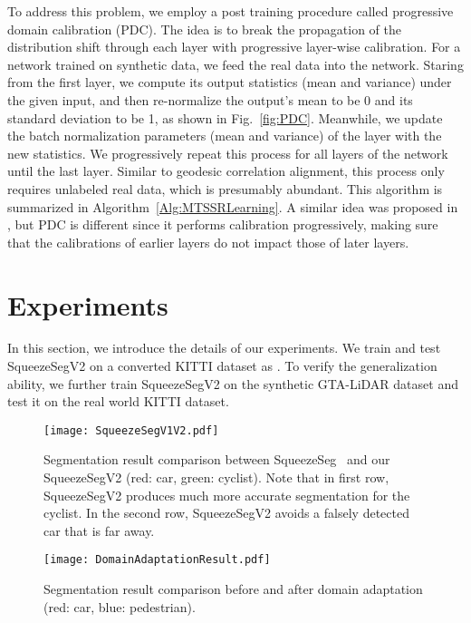 \documentclass[letterpaper, 10 pt, conference]{ieeeconf}
\begin{document}
To address this problem, we employ a post training procedure called progressive domain calibration (PDC). The idea is to break the propagation of the distribution shift through each layer with progressive layer-wise calibration. For a network trained on synthetic data, we feed the real data into the network. Staring from the first layer, we compute its output statistics (mean and variance) under the given input, and then re-normalize the output's mean to be 0 and its standard deviation to be 1, as shown in Fig.~\ref{fig:PDC}. Meanwhile, we update the batch normalization parameters (mean and variance) of the layer with the new statistics. We progressively repeat this process for all layers of the network until the last layer. Similar to geodesic correlation alignment, this process only requires unlabeled real data, which is presumably abundant. This algorithm is summarized in Algorithm~\ref{Alg:MTSSRLearning}.
A similar idea was proposed in \cite{li2018adaptive}, but PDC is different since it performs calibration progressively, making sure that the calibrations of earlier layers do not impact those of later layers. 


\section{Experiments}
\label{sec:Experiments}
In this section, we introduce the details of our experiments. 
We train and test SqueezeSegV2 on a converted KITTI \cite{geiger2012we} dataset as \cite{wu2017squeezeseg}. To verify the generalization ability, we further train SqueezeSegV2 on the synthetic GTA-LiDAR dataset and test it on the real world KITTI dataset.

\begin{figure*}[!t]
\begin{center}
\centering \texttt{[image: SqueezeSegV1V2.pdf]}
\vspace{-4pt}
\caption{Segmentation result comparison between SqueezeSeg~\cite{wu2017squeezeseg} and our SqueezeSegV2 (red: car, green: cyclist). Note that in first row, SqueezeSegV2 produces much more accurate segmentation for the cyclist. In the second row, SqueezeSegV2 avoids a falsely detected car that is far away.}
\label{fig:SqueezeSegV1V2}
\vspace{-5pt}
\end{center}
\end{figure*}

\begin{figure*}[!t]
\begin{center}
\centering \texttt{[image: DomainAdaptationResult.pdf]}
\vspace{-6pt}
\caption{Segmentation result comparison before and after domain adaptation (red: car, blue: pedestrian).}
\label{fig:DomainAdaptationResult}
\vspace{-12pt}
\end{center}
\end{figure*}
\end{document}
